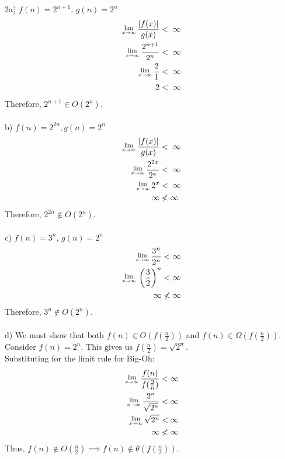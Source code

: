 \documentclass[12pt]{report}
\newcommand{\Lim}[1]{\raisebox{0.5ex}{\scalebox{0.8}{$\displaystyle \lim_{#1}\;$}}}
\newcommand{\MLim}{\Lim{x\rightarrow\infty}}
\newcommand{\no}{\noindent}
\begin{document}
	\pagebreak
	\no 2a) $f(n) = 2^{n+1} \text{, } g(n) = 2^n$ \\
	\begin{align*}
	\Lim{x\rightarrow\infty} \frac{|f(x)|}{g(x)} &< \; \infty \\
	\Lim{x\rightarrow\infty} \frac{2^{n+1}}{2^n} &< \; \infty \\
	\Lim{x\rightarrow\infty} \frac{2}{1} &< \; \infty \\
	2 &< \; \infty \\
	\end{align*}
	Therefore, $2^{n+1} \in O(2^n)$.\\ \\
	\no b) $f(n) = 2^{2n}, g(n) = 2^n $
	\begin{align*}
	\MLim \frac{|f(x)|}{g(x)} &< \; \infty \\
	\MLim \frac{2^{2x}}{2^x} &< \; \infty \\
	\MLim 2^x &< \; \infty \\
	\infty &\nless \infty\\
	\end{align*}
	Therefore, $2^{2n} \notin O(2^n)$.\\ \\
	\no c) $f(n) = 3^n $, $g(n) = 2^n$ \\
	\begin{align*}
	\MLim \frac{3^n}{2^n} &< \infty \\
	\MLim \left(\frac{3}{2}\right)^n &< \infty\\
	\infty &\nless \infty
	\end{align*}
	Therefore, $ 3^n \notin O(2^n)$.\\ \\
	
	\pagebreak
	\no d) We must show that both $f(n) \in O(f(\frac{n}{2}))$ and $f(n) \in \Omega(f(\frac{n}{2}))$. Consider $f(n) = 2^n\text{. This gives us } f(\frac{n}{2}) = \sqrt{2^n}$. \\
	Substituting for the limit rule for Big-Oh: \\
	\begin{align*}
	\MLim \frac{f(n)}{f(\frac{2}{n})} &< \infty \\
	\MLim \frac{2^n}{\sqrt{2^n}} &< \infty \\
	\MLim \sqrt{2^n} &< \infty \\
	\infty &\nless \infty
	\end{align*}
	Thus, $f(n) \notin O(\frac{n}{2}) \implies f(n) \notin \theta(f(\frac{n}{2}))$. \\
	
\end{document}

